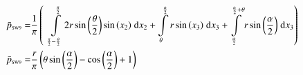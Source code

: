 \begin{align}
    \bar{p}_{\text{\tiny{SW9}}} =&\frac{1}{\pi} \left(\;\;\int\limits_{\frac{\pi}{2} - \frac{\theta}{2}}^{\frac{\pi}{2}}2 r \sin{\left (\frac{\theta}{2} \right )} \sin{\left (x_{2} \right )}\;\mathrm{d}x_{2}+\int\limits_{\theta}^{\frac{\alpha}{2}}r \sin{\left (x_{3} \right )}\;\mathrm{d}x_{3}+\int\limits_{\frac{\alpha}{2}}^{\frac{\alpha}{2} + \theta}r \sin{\left (\frac{\alpha}{2} \right )}\;\mathrm{d}x_{3}\right)\label{pSW9Def}\\
    \bar{p}_{\text{\tiny{SW9}}}  =& \frac{r}{\pi} \left(\theta \sin{\left (\frac{\alpha}{2} \right )} - \cos{\left (\frac{\alpha}{2} \right )} + 1\right)\label{pSW9Sln}
\end{align}